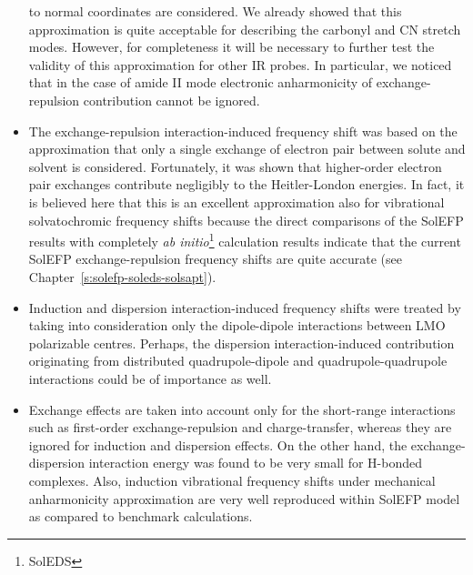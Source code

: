 \documentclass[a4paper,titlepage,twoside,fleqn,12pt]{book}
\begin{document}
\begin{refsection}
\begin{itemize}
to normal coordinates are considered. We already showed that this approximation is quite acceptable 
for describing the carbonyl and CN stretch modes. \citep{Blasiak.Cho.JCP.2014,Blasiak.Cho.JCP.2015,
Blasiak.Ritchie.Webb.Cho.PCCP.2016}
However, for completeness it will be necessary to further test the validity of this approximation 
for other IR probes. In particular, we noticed that in the case of amide II mode
electronic anharmonicity of exchange\hyp{}repulsion contribution cannot be ignored. \citep{Blasiak.Cho.JCP.2015}
 \item The exchange\hyp{}repulsion interaction\hyp{}induced frequency shift was based on the approximation 
that only a single exchange of electron pair between solute and solvent is considered. 
Fortunately, it was shown that higher\hyp{}order electron pair exchanges contribute
negligibly to the Heitler\hyp{}London energies. \citep{Korona.Williams.Bukowski.Jeziorski.Szalewicz.JCP.1997}
In fact, it is believed here that this is an excellent approximation also for vibrational
solvatochromic frequency shifts because the direct comparisons 
of the SolEFP results with completely \emph{ab initio}\footnote{SolEDS} calculation results indicate 
that the current SolEFP exchange\hyp{}repulsion frequency shifts are quite accurate (see
Chapter~\ref{s:solefp-soleds-solsapt}). %
 \item Induction and dispersion interaction\hyp{}induced frequency shifts 
were treated by taking into consideration only the dipole\hyp{}dipole interactions 
between LMO polarizable centres. Perhaps, the dispersion interaction\hyp{}induced 
contribution originating from distributed quadrupole\hyp{}dipole and quadrupole\hyp{}quadrupole 
interactions could be of importance as well.
 \item Exchange effects are taken into account only for the short\hyp{}range
interactions such as first\hyp{}order exchange\hyp{}repulsion and charge\hyp{}transfer, whereas 
they are ignored for induction and dispersion effects. On the other hand,
the exchange\hyp{}dispersion interaction energy was found to be very small
for H-bonded complexes. \citep{Langlet.Caillet.Caffarel.JCP.1995,
Zierkiewicz.Jurecka.Hobza.ChemPhysChem.2005,Cybulski.Sadlej.JCTC.2008} 
Also, induction vibrational frequency shifts
under mechanical anharmonicity approximation
are very well reproduced within SolEFP model as compared to benchmark 
calculations. \citep{Blasiak.Cho.JCP.2014,Blasiak.Cho.JCP.2015,
Blasiak.Ritchie.Webb.Cho.PCCP.2016,Maj.Ahn.Blasiak.Kwak.Han.Cho.XXX.2016}

\end{itemize}
\end{refsection}
\end{document}
